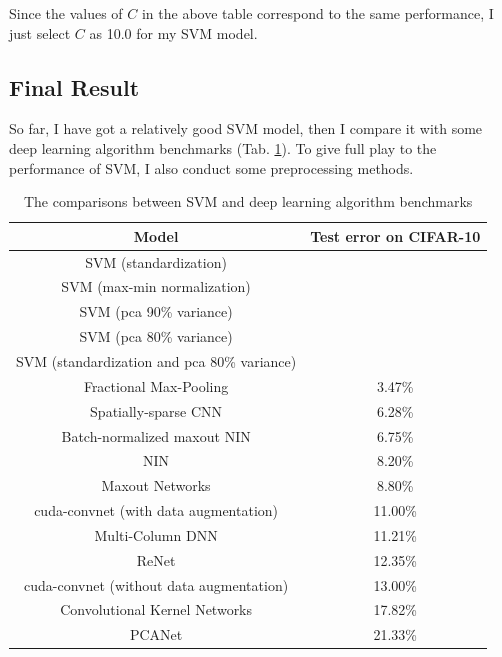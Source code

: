 \documentclass[12pt,a4paper]{article}
\theoremstyle{definition}
\begin{document}
Since the values of $C$ in the above table correspond to the same performance, I just select $C$ as 10.0 for my SVM model.

\subsection{Final Result}
\label{sec:final_res}

So far, I have got a relatively good SVM model, then I compare it with some deep learning algorithm benchmarks \cite{bench} (Tab. \ref{tab:res}). To give full play to the performance of SVM, I also conduct some preprocessing methods.

\begin{table}[H]
	\renewcommand\arraystretch{1.35}
	\caption{The comparisons between SVM and deep learning algorithm benchmarks}
	\label{tab:res}
	\centering
	
	\begin{tabular}{c|c}
		\centering
		Model & Test error on CIFAR-10 \\
		\hline
		\hline
		
		SVM (standardization) & \\
		SVM (max-min normalization) & \\
		SVM (pca 90\% variance) & \\
		SVM (pca 80\% variance) & \\
		SVM (standardization and pca 80\% variance) & \\
		\hline
		Fractional Max-Pooling \cite{bench2} & 3.47\% \\
		Spatially-sparse CNN \cite{bench10} & 6.28\% \\
		Batch-normalized maxout NIN \cite{bench3} & 6.75\% \\
		NIN \cite{bench4} & 8.20\% \\
		Maxout Networks \cite{bench5} & 8.80\% \\
		cuda-convnet \cite{bench1} (with data augmentation) & 11.00\% \\
		Multi-Column DNN \cite{bench6} & 11.21\% \\
		ReNet \cite{bench9} & 12.35\% \\
		cuda-convnet (without data augmentation) & 13.00\% \\
		Convolutional Kernel Networks \cite{bench7} & 17.82\% \\
		PCANet \cite{bench8} & 21.33\% \\
	\end{tabular}
\end{table}
\end{document}

